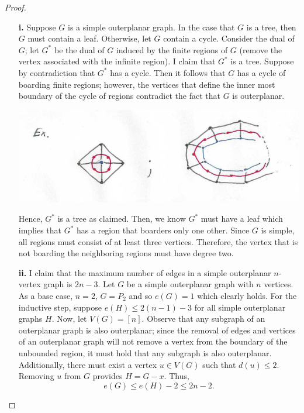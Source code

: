 \documentclass[ 12pt ]{article}
\begin{document}
\begin{enumerate}
			\begin{proof}
				\begin{enumerate}
					\item[\textbf{i.}] Suppose $G$ is a simple outerplanar graph. In the case that $G$ is a tree, then $G$ must contain a leaf. Otherwise, let $G$ contain a cycle.
						Consider the dual of $G$; let $G^*$ be the dual of $G$ induced by the finite regions of $G$ (remove the vertex associated with the infinite region). I claim
						that $G^*$ is a tree. Suppose by contradiction that $G^*$ has a cycle. Then it follows that $G$ has a cycle of boarding finite regions; however, the vertices
						that define the inner most boundary of the cycle of regions contradict the fact that $G$ is outerplanar.
						\begin{center}
							\includegraphics{Capture2}
						\end{center}
						Hence, $G^*$ is a tree as claimed. Then, we know $G^*$ must have a leaf which implies that $G^*$ has a region that boarders only one other. Since $G$ is simple,
						all regions must consist of at least three vertices. Therefore, the vertex that is not boarding the neighboring regions must have degree two.

					\item[\textbf{ii.}] I claim that the maximum number of edges in a simple outerplanar $n$-vertex graph is $2n - 3$. Let $G$ be a simple outerplanar graph with $n$
						vertices. As a base case, $n=2$, $G = P_2$ and so $e(G) = 1$ which clearly holds. For the inductive step, suppose $e(H) \leq 2(n-1) - 3$ for all simple
						outerplanar graphs $H$. Now, let $V(G) = [n]$. Observe that any subgraph of an outerplanar graph is also outerplanar; since the removal of edges and vertices
						of an outerplanar graph will not remove a vertex from the boundary of the unbounded region, it must hold that any subgraph is also outerplanar. Additionally,
						there must exist a vertex $u \in V(G)$ such that $d(u) \leq 2$. Removing $u$ from $G$ provides $H = G - x$. Thus, $$e(G) \leq e(H) - 2 \leq 2n - 2.$$


\end{enumerate}
\end{proof}
\end{enumerate}
\end{document}
